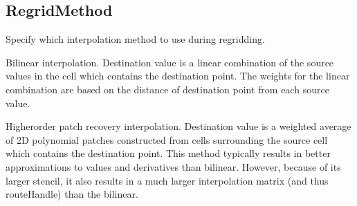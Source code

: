 \documentclass[letterpaper,10pt,english]{sphinxmanual}
\begin{document}
\subsection{RegridMethod}
\label{\detokenize{RegridMethod:regridmethod}}\label{\detokenize{RegridMethod::doc}}

\begin{fulllineitems}
\label{\detokenize{RegridMethod:ESMF.api.constants.RegridMethod}}
Specify which interpolation method to use during regridding.

\begin{fulllineitems}
\label{\detokenize{RegridMethod:ESMF.api.constants.RegridMethod.BILINEAR}}
Bilinear interpolation. Destination value is a linear combination of the 
source values in the cell which contains the destination point. The 
weights for the linear combination are based on the distance of destination 
point from each source value.

\end{fulllineitems}


\begin{fulllineitems}
\label{\detokenize{RegridMethod:ESMF.api.constants.RegridMethod.PATCH}}
Higher\sphinxhyphen{}order patch recovery interpolation. Destination value is a weighted 
average of 2D polynomial patches constructed from cells surrounding the 
source cell which contains the destination point. This method typically 
results in better approximations to values and derivatives than bilinear. 
However, because of its larger stencil, it also results in a much larger 
interpolation matrix (and thus routeHandle) than the bilinear.


\end{fulllineitems}
\end{fulllineitems}
\end{document}
